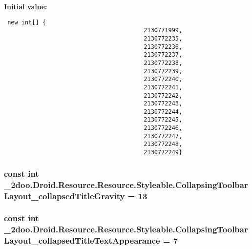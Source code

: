 \textbf{Initial value:}

\begin{Code}\begin{verbatim} new int[] {
                                        2130771999,
                                        2130772235,
                                        2130772236,
                                        2130772237,
                                        2130772238,
                                        2130772239,
                                        2130772240,
                                        2130772241,
                                        2130772242,
                                        2130772243,
                                        2130772244,
                                        2130772245,
                                        2130772246,
                                        2130772247,
                                        2130772248,
                                        2130772249}
\end{verbatim}
\end{Code}
\hypertarget{class__2doo_1_1_droid_1_1_resource_1_1_styleable_5c9df063b8cf7f6254bb0abcb3c94675}{
\subsubsection[{CollapsingToolbarLayout\_\-collapsedTitleGravity}]{\setlength{\rightskip}{0pt plus 5cm}const int \_\-2doo.Droid.Resource.Resource.Styleable.CollapsingToolbarLayout\_\-collapsedTitleGravity = 13}}
\label{class__2doo_1_1_droid_1_1_resource_1_1_styleable_5c9df063b8cf7f6254bb0abcb3c94675}


\hypertarget{class__2doo_1_1_droid_1_1_resource_1_1_styleable_a1193c7f8b7487f82563f515ea16b35b}{
\subsubsection[{CollapsingToolbarLayout\_\-collapsedTitleTextAppearance}]{\setlength{\rightskip}{0pt plus 5cm}const int \_\-2doo.Droid.Resource.Resource.Styleable.CollapsingToolbarLayout\_\-collapsedTitleTextAppearance = 7}}
\label{class__2doo_1_1_droid_1_1_resource_1_1_styleable_a1193c7f8b7487f82563f515ea16b35b}


